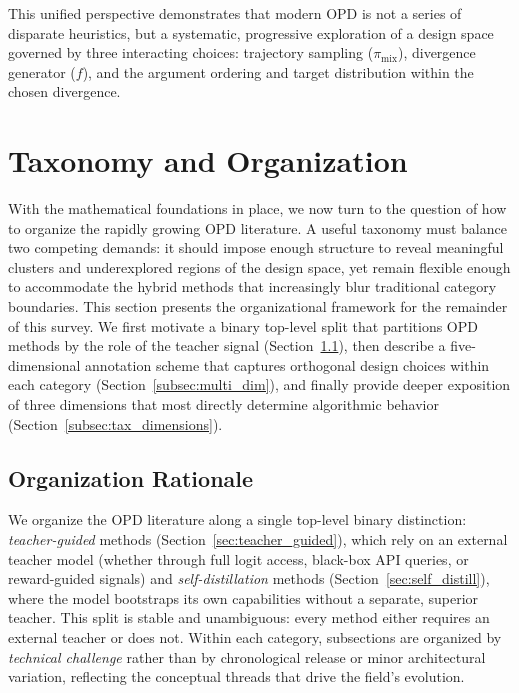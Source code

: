 \documentclass{article} %
\begin{document}
This unified perspective demonstrates that modern OPD is not a series of disparate heuristics, but a systematic, progressive exploration of a design space governed by three interacting choices: trajectory sampling ($\pi_{\text{mix}}$), divergence generator ($f$), and the argument ordering and target distribution within the chosen divergence.




\section{Taxonomy and Organization}
\label{sec:taxonomy}

With the mathematical foundations in place, we now turn to the question of how to organize the rapidly growing OPD literature. A useful taxonomy must balance two competing demands: it should impose enough structure to reveal meaningful clusters and underexplored regions of the design space, yet remain flexible enough to accommodate the hybrid methods that increasingly blur traditional category boundaries. This section presents the organizational framework for the remainder of this survey. We first motivate a binary top-level split that partitions OPD methods by the role of the teacher signal (Section~\ref{subsec:org_rationale}), then describe a five-dimensional annotation scheme that captures orthogonal design choices within each category (Section~\ref{subsec:multi_dim}), and finally provide deeper exposition of three dimensions that most directly determine algorithmic behavior (Section~\ref{subsec:tax_dimensions}).

\subsection{Organization Rationale}
\label{subsec:org_rationale}

We organize the OPD literature along a single top-level binary distinction: \emph{teacher-guided} methods (Section~\ref{sec:teacher_guided}), which rely on an external teacher model (whether through full logit access, black-box API queries, or reward-guided signals) and \emph{self-distillation} methods (Section~\ref{sec:self_distill}), where the model bootstraps its own capabilities without a separate, superior teacher. This split is stable and unambiguous: every method either requires an external teacher or does not. Within each category, subsections are organized by \emph{technical challenge} rather than by chronological release or minor architectural variation, reflecting the conceptual threads that drive the field's evolution.
\end{document}
